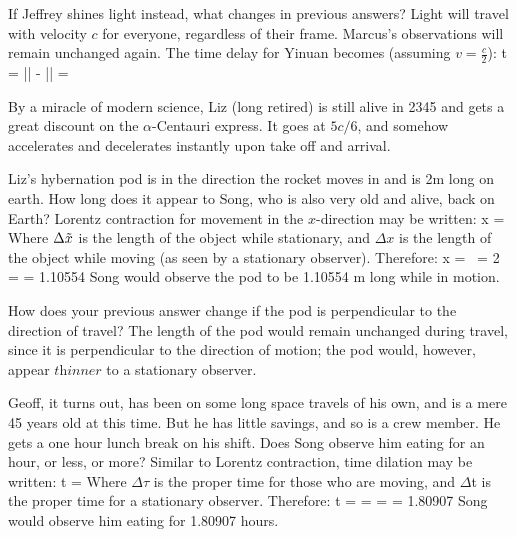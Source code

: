 \item If Jeffrey shines light instead, what changes in previous answers?
\newline Light will travel with velocity $c$ for everyone, regardless of their frame. Marcus's observations will remain unchanged again. The time delay for Yinuan becomes (assuming $v = \frac{c}{2}$):
\be
t = \left|\right| - \left|\right| =  
\ee

\enu

\newpage
{}

By a miracle of modern science, Liz (long retired) is still alive in 2345 and gets a great discount on the
$\alpha$-Centauri express.   It goes at $5c/6$, and somehow accelerates and decelerates instantly upon 
take off and arrival.

\benu

\item
Liz's hybernation pod is in the direction the rocket moves in and is 2m long on earth.  How long does it appear to Song, who is also very old and alive, back on Earth?
\newline Lorentz contraction for movement in the $x$-direction may be written:
\be
\Delta x = \Delta {} \, 
\ee
Where $\Delta \Tilde{x}$ is the length of the object while stationary, and $\Delta x$ is the length of the object while moving (as seen by a stationary observer). Therefore:
\be
\Delta x = \Delta {} \,  = 2 \times {} =   = 1.10554 
\ee
Song would observe the pod to be 1.10554 m long while in motion.

\item How does your previous answer change if the pod is perpendicular to the direction of travel?
\newline The length of the pod would remain unchanged during travel, since it is perpendicular to the direction of motion; the pod would, however, appear $\textit{thinner}$ to a stationary observer.

\item
Geoff, it turns out, has been on some long space travels of his own, and is a mere 45 years old at this time.  But he has little savings, and so is a crew member.  He gets a one hour lunch break on his shift. Does Song observe him eating for an hour, or less, or more?
\newline Similar to Lorentz contraction, time dilation may be written:
\be
\Delta t = 
\ee
Where $\Delta \tau$ is the proper time for those who are moving, and $\Delta $t is the proper time for a stationary observer. Therefore:
\be
\Delta t =  =  =   = 1.80907 
\ee
Song would observe him eating for 1.80907 hours.

